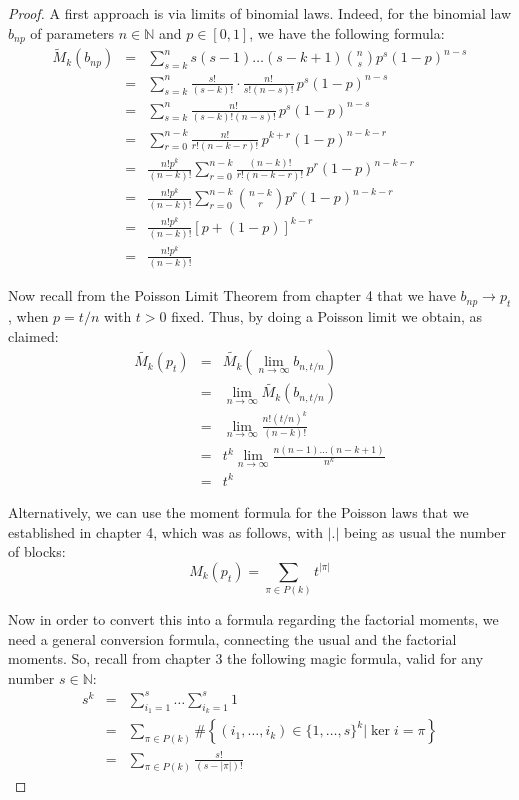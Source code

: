 \documentclass[12pt]{amsbook}
\begin{document}
\begin{proof}
A first approach is via limits of binomial laws. Indeed, for the binomial law $b_{np}$ of parameters $n\in\mathbb N$ and $p\in[0,1]$, we have the following formula:
\begin{eqnarray*}
\widetilde{M}_k(b_{np})
&=&\sum_{s=k}^ns(s-1)\ldots(s-k+1)\binom{n}{s}p^s(1-p)^{n-s}\\
&=&\sum_{s=k}^n\frac{s!}{(s-k)!}\cdot\frac{n!}{s!(n-s)!}\,p^s(1-p)^{n-s}\\
&=&\sum_{s=k}^n\frac{n!}{(s-k)!(n-s)!}\,p^s(1-p)^{n-s}\\
&=&\sum_{r=0}^{n-k}\frac{n!}{r!(n-k-r)!}\,p^{k+r}(1-p)^{n-k-r}\\
&=&\frac{n!p^k}{(n-k)!}\sum_{r=0}^{n-k}\frac{(n-k)!}{r!(n-k-r)!}\,p^r(1-p)^{n-k-r}\\
&=&\frac{n!p^k}{(n-k)!}\sum_{r=0}^{n-k}\binom{n-k}{r}p^r(1-p)^{n-k-r}\\
&=&\frac{n!p^k}{(n-k)!}[p+(1-p)]^{k-r}\\
&=&\frac{n!p^k}{(n-k)!}
\end{eqnarray*}

Now recall from the Poisson Limit Theorem from chapter 4 that we have $b_{np}\to p_t$, when $p=t/n$ with $t>0$ fixed. Thus, by doing a Poisson limit we obtain, as claimed:
\begin{eqnarray*}
\widetilde{M_k}(p_t)
&=&\widetilde{M_k}\left(\lim_{n\to\infty}b_{n,t/n}\right)\\
&=&\lim_{n\to\infty}\widetilde{M_k}(b_{n,t/n})\\
&=&\lim_{n\to\infty}\frac{n!(t/n)^k}{(n-k)!}\\
&=&t^k\lim_{n\to\infty}\frac{n(n-1)\ldots(n-k+1)}{n^k}\\
&=&t^k
\end{eqnarray*}

Alternatively, we can use the moment formula for the Poisson laws that we established in chapter 4, which was as follows, with $|.|$ being as usual the number of blocks:
$$M_k(p_t)=\sum_{\pi\in P(k)}t^{|\pi|}$$

Now in order to convert this into a formula regarding the factorial moments, we need a general conversion formula, connecting the usual and the factorial moments. So, recall from chapter 3 the following magic formula, valid for any number $s\in\mathbb N$:
\begin{eqnarray*}
s^k
&=&\sum_{i_1=1}^s\ldots\sum_{i_k=1}^s1\\
&=&\sum_{\pi\in P(k)}\#\left\{(i_1,\ldots,i_k)\in\{1,\ldots,s\}^k\Big|\ker i=\pi\right\}\\
&=&\sum_{\pi\in P(k)}\frac{s!}{(s-|\pi|)!}
\end{eqnarray*}


\end{proof}
\end{document}
